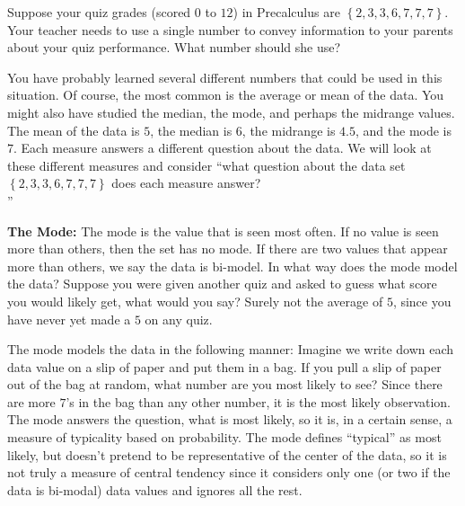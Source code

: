 \documentclass[10pt,]{book}
\theoremstyle{ptxdefinitionnotitle}
\theoremstyle{ptxdefinitiontitle}
\numberwithin{equation}{section}
\begin{document}
\begin{example}[{.}]\label{example-1}
\hypertarget{p-40}{}%
Suppose your quiz grades (scored \(0\) to \(12\)) in Precalculus are \(\left\{ 2, 3, 3, 6, 7, 7, 7 \right\}\). Your teacher needs to use a single number to convey information to your parents about your quiz performance. What number should she use? \\%
\par
\hypertarget{p-41}{}%
You have probably learned several different numbers that could be used in this situation. Of course, the most common is the average or mean of the data. You might also have studied the median, the mode, and perhaps the midrange values. The mean of the data is \(5\), the median is \(6\), the midrange is \(4.5\), and the mode is \(7\). Each measure answers a different question about the data. We will look at these different measures and consider ``what question about the data set \(\left\{ 2, 3, 3, 6, 7, 7, 7 \right\}\) does each measure answer? \\''%
\par
\hypertarget{p-42}{}%
\textbf{The Mode:} The mode is the value that is seen most often. If no value is seen more than others, then the set has no mode. If there are two values that appear more than others, we say the data is bi-model. In what way does the mode model the data? Suppose you were given another quiz and asked to guess what score you would likely get, what would you say? Surely not the average of \(5\), since you have never yet made a \(5\) on any quiz. \\%
\par
\hypertarget{p-43}{}%
The mode models the data in the following manner: Imagine we write down each data value on a slip of paper and put them in a bag. If you pull a slip of paper out of the bag at random, what number are you most likely to see? Since there are more \(7\)’s in the bag than any other number, it is the most likely observation. The mode answers the question, what is most likely, so it is, in a certain sense, a measure of typicality based on probability. The mode defines ``typical'' as most likely, but doesn’t pretend to be representative of the center of the data, so it is not truly a measure of central tendency since it considers only one (or two if the data is bi-modal) data values and ignores all the rest. \\%
\par
\hypertarget{p-44}{}%

\end{example}
\end{document}
